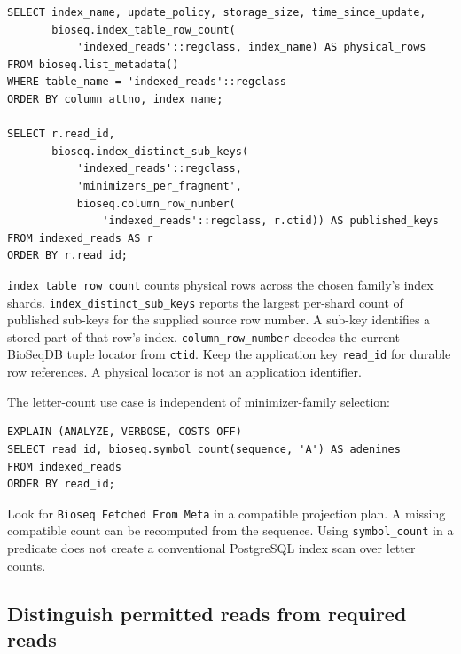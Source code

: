 \par\noindent\begin{minipage}{\linewidth}
\begin{lstlisting}[style=bioseq-appendix-sql,
  caption={Inspect index storage and one source row's published keys.}]
SELECT index_name, update_policy, storage_size, time_since_update,
       bioseq.index_table_row_count(
           'indexed_reads'::regclass, index_name) AS physical_rows
FROM bioseq.list_metadata()
WHERE table_name = 'indexed_reads'::regclass
ORDER BY column_attno, index_name;

SELECT r.read_id,
       bioseq.index_distinct_sub_keys(
           'indexed_reads'::regclass,
           'minimizers_per_fragment',
           bioseq.column_row_number(
               'indexed_reads'::regclass, r.ctid)) AS published_keys
FROM indexed_reads AS r
ORDER BY r.read_id;
\end{lstlisting}
\end{minipage}

\texttt{index\_table\_row\_count} counts physical rows across the chosen
family's index shards. \texttt{index\_distinct\_sub\_keys} reports the
largest per-shard count of published sub-keys for the supplied source row
number. A sub-key identifies a stored part of that row's index.
\texttt{column\_row\_number} decodes the current BioSeqDB tuple locator
from \texttt{ctid}. Keep the application key \texttt{read\_id} for durable
row references. A physical locator is not an application identifier.

The letter-count use case is independent of minimizer-family selection:

\par\noindent\begin{minipage}{\linewidth}
\begin{lstlisting}[style=bioseq-appendix-sql,
  caption={Inspect direct use of saved letter counts.}]
EXPLAIN (ANALYZE, VERBOSE, COSTS OFF)
SELECT read_id, bioseq.symbol_count(sequence, 'A') AS adenines
FROM indexed_reads
ORDER BY read_id;
\end{lstlisting}
\end{minipage}

Look for \texttt{Bioseq Fetched From Meta} in a compatible projection
plan. A missing compatible count can be recomputed from the sequence.
Using \texttt{symbol\_count} in a predicate does not create a conventional
PostgreSQL index scan over letter counts.

\subsection{Distinguish permitted reads from required reads}


